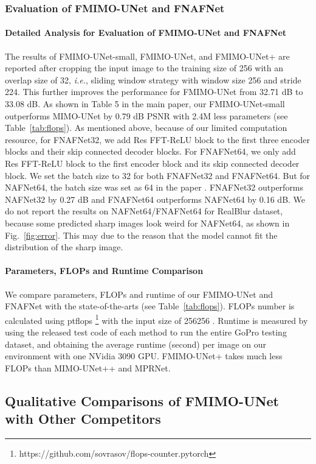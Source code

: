 \documentclass[letterpaper]{article} \usepackage{aaai23}  \usepackage{times}  \usepackage{helvet}  \usepackage{courier}  \usepackage[hyphens]{url}  \usepackage{graphicx} \usepackage{enumitem}
\begin{document}
\subsubsection{Evaluation of FMIMO-UNet and FNAFNet}
\paragraph{Detailed Analysis for Evaluation of FMIMO-UNet and FNAFNet}
The results of FMIMO-UNet-small, FMIMO-UNet, and FMIMO-UNet+ are reported after cropping the input image to the training size of 256 with an overlap size of 32, \emph{i.e.}, sliding window strategy with window size 256 and stride 224. This further improves the performance for FMIMO-UNet from 32.71 dB to 33.08 dB. As shown in Table 5 in the main paper, our FMIMO-UNet-small outperforms MIMO-UNet by 0.79 dB PSNR with 2.4M less parameters (see Table~\ref{tab:flops}). As mentioned above, because of our limited computation resource, for FNAFNet32, we add Res FFT-ReLU block to the first three encoder blocks and their skip connected decoder blocks. For FNAFNet64, we only add Res FFT-ReLU block to the first encoder block and its skip connected decoder block. We set the batch size to 32 for both FNAFNet32 and
FNAFNet64. But for NAFNet64, the batch size was set as 64 in the paper \cite{Chen2022simple}. FNAFNet32 outperforms NAFNet32 by 0.27 dB and FNAFNet64 outperforms NAFNet64 by 0.16 dB. We do not report the results on NAFNet64/FNAFNet64 for RealBlur dataset, because some predicted sharp images look weird for NAFNet64, as shown in Fig.~\ref{fig:error}. This may due to the reason that the model cannot fit the distribution of the sharp image.

\paragraph{Parameters, FLOPs and Runtime Comparison}
We compare parameters, FLOPs and runtime of our FMIMO-UNet and FNAFNet with the state-of-the-arts (see Table~\ref{tab:flops}). FLOPs number is calculated using ptflops \footnote{https://github.com/sovrasov/flops-counter.pytorch} with the input size of 256256 \cite{Zou2021sdwnet}. Runtime is measured by using the released test code of each method to run the entire GoPro \cite{Nah2017deep} testing dataset, and obtaining the average runtime (second) per image on our environment with one NVidia 3090 GPU. FMIMO-UNet+ takes much less FLOPs than MIMO-UNet++ and MPRNet.

\subsection{Qualitative Comparisons of FMIMO-UNet with Other Competitors}
\end{document}

